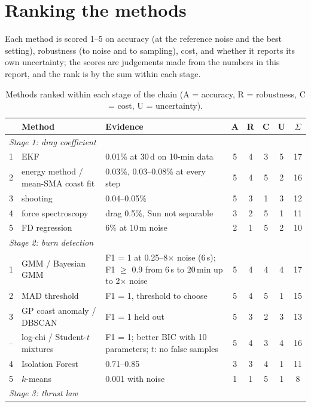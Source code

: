 \documentclass[11pt,a4paper]{article}
\begin{document}
\section{Ranking the methods}\label{sec:ranking}
Each method is scored 1--5 on accuracy (at the reference noise and the best setting), robustness (to noise and to
sampling), cost, and whether it reports its own uncertainty; the scores are judgements made from the numbers in
this report, and the rank is by the sum within each stage.
\begin{table}[H]\centering\small
\caption{Methods ranked within each stage of the chain (A = accuracy, R = robustness, C = cost, U = uncertainty).}\label{tab:rank}
\begin{tabularx}{\textwidth}{clXccccc}
\toprule
& Method & Evidence & A & R & C & U & $\Sigma$\\\midrule
\multicolumn{8}{l}{\textit{Stage 1: drag coefficient}}\\
1 & EKF & 0.01\% at 30\,d on 10-min data & 5 & 4 & 3 & 5 & 17\\
2 & energy method / mean-SMA coast fit & 0.03\%, 0.03--0.08\% at every step & 5 & 4 & 5 & 2 & 16\\
3 & shooting & 0.04--0.05\% & 5 & 3 & 1 & 3 & 12\\
4 & force spectroscopy & drag 0.5\%, Sun not separable & 3 & 2 & 5 & 1 & 11\\
5 & FD regression & 6\% at 10\,m noise & 2 & 1 & 5 & 2 & 10\\\midrule
\multicolumn{8}{l}{\textit{Stage 2: burn detection}}\\
1 & GMM / Bayesian GMM & F1 = 1 at 0.25--8$\times$ noise (6\,s); F1 $\ge$ 0.9 from 6\,s to 20\,min up to 2$\times$ noise & 5 & 4 & 4 & 4 & 17\\
2 & MAD threshold & F1 = 1, threshold to choose & 5 & 4 & 5 & 1 & 15\\
3 & GP coast anomaly / DBSCAN & F1 = 1 held out & 5 & 3 & 2 & 3 & 13\\
-- & log-chi / Student-$t$ mixtures & F1 = 1; better BIC with 10 parameters; $t$: no false samples & 5 & 4 & 3 & 4 & 16\\
4 & Isolation Forest & 0.71--0.85 & 3 & 3 & 4 & 1 & 11\\
5 & $k$-means & 0.001 with noise & 1 & 1 & 5 & 1 & 8\\\midrule
\multicolumn{8}{l}{\textit{Stage 3: thrust law}}\\

\end{tabularx}
\end{table}
\end{document}
